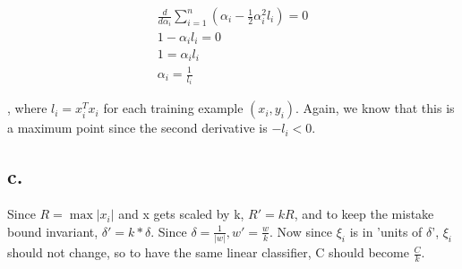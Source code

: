 \documentclass[]{article}
\begin{document}
\begin{align*}
\frac{d}{d\alpha_i} \sum_{i=1}^n\left(\alpha_i - \frac{1}{2}\alpha_i^{2} l_i\right) = 0 \\
1 - \alpha_i l_i = 0 \\
1 = \alpha_i l_i \\
\alpha_i = \frac{1}{l_i} 
\end{align*}


, where $l_i = x_i^Tx_i$ for each training example $(x_i, y_i)$. Again, we know that this is a maximum point since the second derivative is $-l_i < 0$.

\subsection{c.}

Since $R = \max |x_i|$ and x gets scaled by k, $R' = kR$, and to keep the mistake bound invariant, $\delta' = k*\delta$. Since $\delta = \frac{1}{|w|}, w' = \frac{w}{k}$. Now since $\xi_i$ is in 'units of $\delta$', $\xi_i$ should not change, so to have the same linear classifier, C should become $\frac{C}{k}$.
\end{document}
